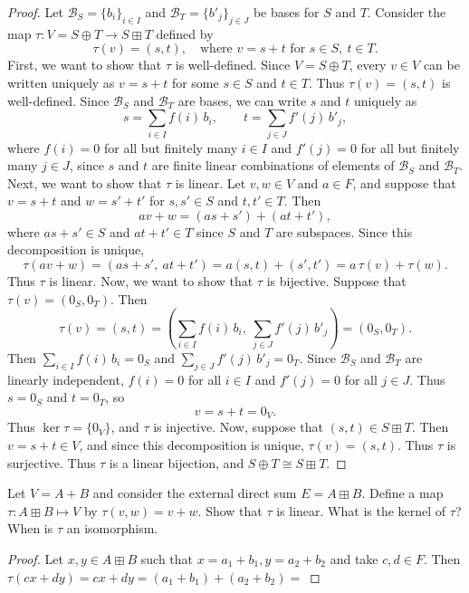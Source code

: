 \begin{proof}
    Let $\mathcal{B}_S = \{b_i\}_{i \in I}$ and $\mathcal{B}_T = \{b'_j\}_{j \in J}$ be bases for $S$ and $T$.
    Consider the map $\tau \colon V = S \oplus T \to S \boxplus T$ defined by
    \[
        \tau(v) = (s, t), \quad \text{where } v = s + t \text{ for } s \in S,\ t \in T.
    \]
    First, we want to show that $\tau$ is well-defined. Since $V = S \oplus T$, every
    $v \in V$ can be written uniquely as $v = s + t$ for some $s \in S$ and $t \in T$.
    Thus $\tau(v) = (s, t)$ is well-defined. Since $\mathcal{B}_S$ and $\mathcal{B}_T$ are
    bases, we can write $s$ and $t$ uniquely as
    \[
        s = \sum_{i \in I} f(i)\, b_i, \qquad t = \sum_{j \in J} f'(j)\, b'_j,
    \]
    where $f(i) = 0$ for all but finitely many $i \in I$ and $f'(j) = 0$ for all but finitely many $j \in J$,
    since $s$ and $t$ are finite linear combinations of elements of $\mathcal{B}_S$ and $\mathcal{B}_T$.
    Next, we want to show that $\tau$ is linear. Let $v, w \in V$ and $a \in F$, and suppose
    that $v = s + t$ and $w = s' + t'$ for $s, s' \in S$ and $t, t' \in T$. Then
    \[
        av + w = (as + s') + (at + t'),
    \]
    where $as + s' \in S$ and $at + t' \in T$ since $S$ and $T$ are subspaces. Since this
    decomposition is unique,
    \[
        \tau(av + w) = (as + s',\ at + t') = a(s, t) + (s', t') = a\,\tau(v) + \tau(w).
    \]
    Thus $\tau$ is linear.
    Now, we want to show that $\tau$ is bijective.
    Suppose that $\tau(v) = (0_S, 0_T)$. Then
    \[
        \tau(v) = (s, t) = \left( \sum_{i \in I} f(i)\, b_i,\ \sum_{j \in J} f'(j)\, b'_j \right) = (0_S, 0_T).
    \]
    Then $\sum_{i \in I} f(i)\, b_i = 0_S$ and $\sum_{j \in J} f'(j)\, b'_j = 0_T$.
    Since $\mathcal{B}_S$ and $\mathcal{B}_T$ are linearly independent, $f(i) = 0$ for all
    $i \in I$ and $f'(j) = 0$ for all $j \in J$. Thus $s = 0_S$ and $t = 0_T$, so
    \[
        v = s + t = 0_V.
    \]
    Thus $\ker \tau = \{0_V\}$, and $\tau$ is injective.
    Now, suppose that $(s, t) \in S \boxplus T$. Then $v = s + t \in V$, and since this
    decomposition is unique, $\tau(v) = (s, t)$. Thus $\tau$ is surjective.
    Thus $\tau$ is a linear bijection, and $S \oplus T \cong S \boxplus T$.
\end{proof}

\begin{tcolorbox}[title=Problem 6, breakable]
    Let $V = A + B$ and consider the external direct sum $E = A \boxplus B$.
    Define a map $\tau : A \boxplus B \mapsto V$ by $\tau(v, w) = v + w$.
    Show that $\tau$ is linear. What is the kernel of $\tau$? When is $\tau$ an isomorphism.
\end{tcolorbox}

\begin{proof}
    Let $x, y \in A \boxplus B$ such that $x = a_1 + b_1, y = a_2 + b_2$ and take $c, d \in F$.
    Then $\tau(cx + dy) = cx + dy = (a_1 + b_1) + (a_2 + b_2) = $
\end{proof}